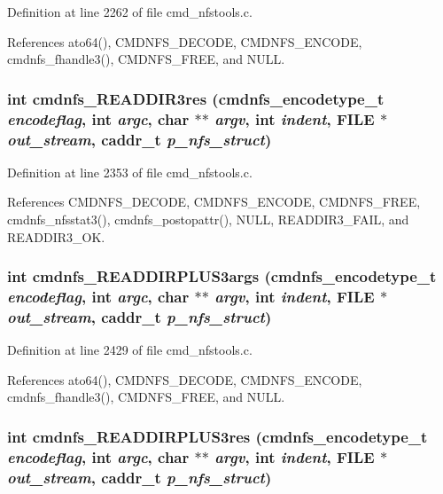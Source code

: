 Definition at line 2262 of file cmd\_\-nfstools.c.

References ato64(), CMDNFS\_\-DECODE, CMDNFS\_\-ENCODE, cmdnfs\_\-fhandle3(), CMDNFS\_\-FREE, and NULL.
\subsubsection{\setlength{\rightskip}{0pt plus 5cm}int cmdnfs\_\-READDIR3res ({\bf cmdnfs\_\-encodetype\_\-t} {\em encodeflag}, int {\em argc}, char $\ast$$\ast$ {\em argv}, int {\em indent}, FILE $\ast$ {\em out\_\-stream}, caddr\_\-t {\em p\_\-nfs\_\-struct})}\label{cmd__nfstools_8c_a92}




Definition at line 2353 of file cmd\_\-nfstools.c.

References CMDNFS\_\-DECODE, CMDNFS\_\-ENCODE, CMDNFS\_\-FREE, cmdnfs\_\-nfsstat3(), cmdnfs\_\-postopattr(), NULL, READDIR3\_\-FAIL, and READDIR3\_\-OK.
\subsubsection{\setlength{\rightskip}{0pt plus 5cm}int cmdnfs\_\-READDIRPLUS3args ({\bf cmdnfs\_\-encodetype\_\-t} {\em encodeflag}, int {\em argc}, char $\ast$$\ast$ {\em argv}, int {\em indent}, FILE $\ast$ {\em out\_\-stream}, caddr\_\-t {\em p\_\-nfs\_\-struct})}\label{cmd__nfstools_8c_a93}




Definition at line 2429 of file cmd\_\-nfstools.c.

References ato64(), CMDNFS\_\-DECODE, CMDNFS\_\-ENCODE, cmdnfs\_\-fhandle3(), CMDNFS\_\-FREE, and NULL.
\subsubsection{\setlength{\rightskip}{0pt plus 5cm}int cmdnfs\_\-READDIRPLUS3res ({\bf cmdnfs\_\-encodetype\_\-t} {\em encodeflag}, int {\em argc}, char $\ast$$\ast$ {\em argv}, int {\em indent}, FILE $\ast$ {\em out\_\-stream}, caddr\_\-t {\em p\_\-nfs\_\-struct})}\label{cmd__nfstools_8c_a95}




